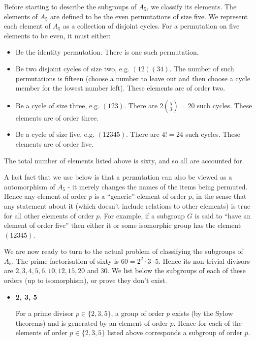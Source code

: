 \documentclass[11pt]{article} \usepackage{amssymb}
\begin{document}
\begin{enumerate}
    Before starting to describe the subgroups of $A_5$, we classify its
    elements.
    The elements of $A_5$ are defined to be the even permutations of size five.
    We represent each element of $A_5$
    as a collection of disjoint cycles. For a permutation on five elements
    to be even, it must either:
    \begin{itemize}
    \item Be the identity permutation. There is one such permutation.
    \item Be two disjoint cycles of size two, e.g. $(12)(34)$. The number of 
      such permutations
      is fifteen (choose a number to leave out and then choose a cycle member
      for the lowest number left). These elements are of order two.
    \item Be a cycle of size three, e.g. $(123)$. There are 
      $2{5 \choose 3}=20$ such cycles. These elements are of order three.
    \item Be a cycle of size five, e.g. $(12345)$. There are $4!=24$ such 
      cycles. These elements are of order five.
    \end{itemize}
    The total number of elements listed above is sixty, and so all are accounted
    for.

    A last fact that we use below is that a permutation can also be viewed
    as a automorphism of $A_5$ - it merely changes the names of the items 
    being permuted. Hence any element of order $p$
    is a ``generic'' element of order $p$, in the sense that any statement
    about it (which doesn't include relations to other elements) is true
    for all other elements of order $p$. For example, if a subgroup $G$ is said
    to ``have an element of order five'' then either it or some isomorphic
    group has the element $(12345)$.

    We are now ready to turn to the actual problem of classifying the subgroups
    of $A_5$.
    The prime factorisation of sixty is $60=2^2\cdot 3\cdot 5$. Hence its non-trivial
    divisors are $2,3,4,5,6,10,12,15,20$ and $30$. We list below the subgroups
    of each of these orders (up to isomorphism), or prove they don't exist.

    \begin{itemize}
    \item {\bf 2, 3, 5}
      
      For a prime divisor $p\in\{2,3,5\}$, a group of order $p$ exists 
      (by the Sylow theorems) and is generated by
      an element of order $p$. Hence for each of the elements of order 
      $p\in\{2,3,5\}$ listed above
      corresponds a subgroup of order $p$.


\end{itemize}
\end{enumerate}
\end{document}
